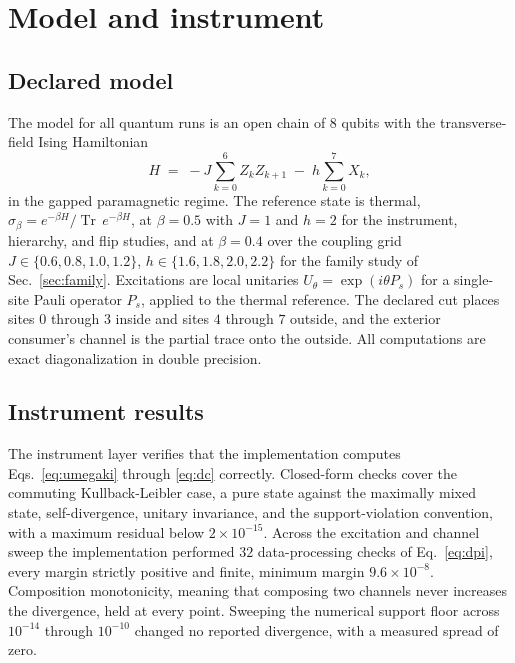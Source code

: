 \documentclass[aps,prd,reprint,nofootinbib,longbibliography]{revtex4-2}
\newcommand{\Tr}{\operatorname{Tr}}
\begin{document}
\section{Model and instrument}
\label{sec:model}

\subsection{Declared model}

The model for all quantum runs is an open chain of $8$ qubits with the
transverse-field Ising Hamiltonian
\begin{equation}
H \;=\; -J\sum_{k=0}^{6} Z_k Z_{k+1} \;-\; h\sum_{k=0}^{7} X_k ,
\label{eq:ising}
\end{equation}
in the gapped paramagnetic regime.  The reference state is thermal,
$\sigma_\beta = e^{-\beta H}/\Tr\,e^{-\beta H}$, at $\beta=0.5$ with $J=1$
and $h=2$ for the instrument, hierarchy, and flip studies, and at
$\beta=0.4$ over the coupling grid $J\in\{0.6,0.8,1.0,1.2\}$,
$h\in\{1.6,1.8,2.0,2.2\}$ for the family study of Sec.~\ref{sec:family}.
Excitations are local unitaries $U_\theta=\exp(i\theta P_s)$ for a
single-site Pauli operator $P_s$, applied to the thermal reference.  The
declared cut places sites $0$ through $3$ inside and sites $4$ through $7$
outside, and the exterior consumer's channel is the partial trace onto the
outside.  All computations are exact diagonalization in double precision.

\subsection{Instrument results}

The instrument layer verifies that the implementation computes
Eqs.~\eqref{eq:umegaki} through \eqref{eq:dc} correctly.  Closed-form
checks cover the commuting Kullback-Leibler case, a pure state against the
maximally mixed state, self-divergence, unitary invariance, and the
support-violation convention, with a maximum residual below
$2\times 10^{-15}$.  Across the excitation and channel sweep the
implementation performed $32$ data-processing checks of
Eq.~\eqref{eq:dpi}, every margin strictly positive and finite, minimum
margin $9.6\times 10^{-8}$.  Composition monotonicity, meaning that
composing two channels never increases the divergence, held at every point.
Sweeping the numerical support floor across
$10^{-14}$ through $10^{-10}$ changed no reported divergence, with a
measured spread of zero.
\end{document}
